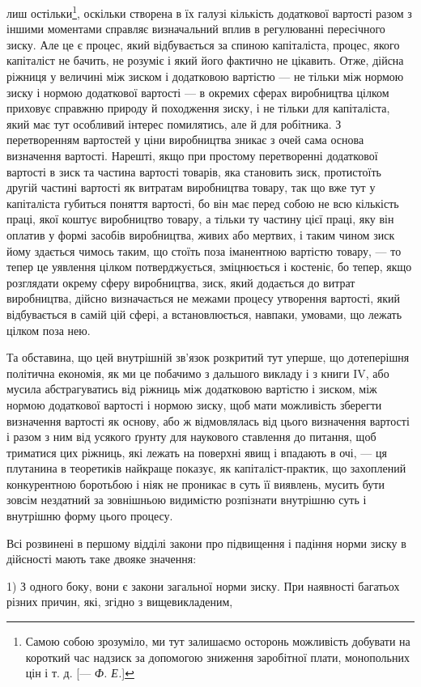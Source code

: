 \parcont{}  %
лиш остільки\footnote{
Самою собою зрозуміло, ми тут залишаємо осторонь можливість добувати
на короткий час надзиск за допомогою зниження заробітної плати, монопольних
цін і т. д. [— \emph{Ф. Е.}]
}, оскільки створена в їх галузі кількість додаткової вартості разом з іншими моментами
справляє визначальний вплив в регулюванні пересічного зиску. Але це є процес, який відбувається за
спиною капіталіста, процес, якого капіталіст
не бачить, не розуміє і який його фактично не цікавить. Отже,
дійсна ріжниця у величині між зиском і додатковою вартістю — не тільки між нормою зиску і нормою
додаткової вартості — в окремих сферах виробництва цілком приховує справжню природу й походження
зиску, і не тільки для капіталіста, який має
тут особливий інтерес помилятись, але й для робітника. З перетворенням вартостей у ціни виробництва
зникає з очей сама
основа визначення вартості. Нарешті, якщо при простому перетворенні додаткової вартості в зиск та
частина вартості товарів, яка становить зиск, протистоїть другій частині вартості як
витратам виробництва товару, так що вже тут у капіталіста
губиться поняття вартості, бо він має перед собою не всю кількість праці, якої коштує виробництво
товару, а тільки ту частину
цієї праці, яку він оплатив у формі засобів виробництва, живих
або мертвих, і таким чином зиск йому здається чимось таким,
що стоїть поза іманентною вартістю товару, — то тепер це
уявлення цілком потверджується, зміцнюється і костеніє, бо
тепер, якщо розглядати окрему сферу виробництва, зиск, який
додається до витрат виробництва, дійсно визначається не межами процесу утворення вартості, який
відбувається в самій
цій сфері, а встановлюється, навпаки, умовами, що лежать цілком поза нею.

Та обставина, що цей внутрішній зв’язок розкритий тут
уперше, що дотеперішня політична економія, як ми це побачимо
з дальшого викладу і з книги IV, або мусила абстрагуватись
від ріжниць між додатковою вартістю і зиском, між нормою
додаткової вартості і нормою зиску, щоб мати можливість зберегти визначення вартості як основу, або
ж відмовлялась від
цього визначення вартості і разом з ним від усякого ґрунту
для наукового ставлення до питання, щоб триматися цих ріжниць, які лежать на поверхні явищ і
впадають в очі, — ця плутанина в теоретиків найкраще показує, як капіталіст-практик, що
захоплений конкурентною боротьбою і ніяк не проникає в суть
її виявлень, мусить бути зовсім нездатний за зовнішньою видимістю розпізнати внутрішню суть і
внутрішню форму цього процесу.

Всі розвинені в першому відділі закони про підвищення
і падіння норми зиску в дійсності мають таке двояке значення:

1) З одного боку, вони є закони загальної норми зиску. При
наявності багатьох різних причин, які, згідно з вищевикладеним,
\parbreak{}  %
